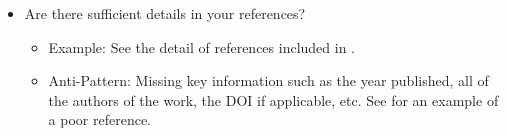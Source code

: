 \begin{itemize}
    \item Are there sufficient details in your references?
    \begin{itemize}
        \item Example: See the detail of references included in \citet{CaseOfDisappearingTeaspoons}.
        \item Anti-Pattern: Missing key information such as the year published, all of the authors of the work, the DOI if applicable, etc. See \citet{BadReference} for an example of a poor reference.
    \end{itemize}

\end{itemize}